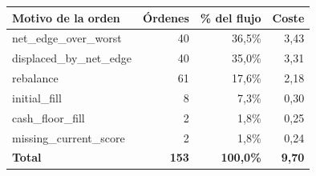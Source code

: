 \begin{tabular}{lrrr}
\toprule
Motivo de la orden & Órdenes & \% del flujo & Coste \\
\midrule
net\_edge\_over\_worst & 40 & 36,5\% & 3,43 \\
displaced\_by\_net\_edge & 40 & 35,0\% & 3,31 \\
rebalance & 61 & 17,6\% & 2,18 \\
initial\_fill & 8 & 7,3\% & 0,30 \\
cash\_floor\_fill & 2 & 1,8\% & 0,25 \\
missing\_current\_score & 2 & 1,8\% & 0,24 \\
\textbf{Total} & \textbf{153} & \textbf{100,0\%} & \textbf{9,70} \\
\bottomrule
\end{tabular}
